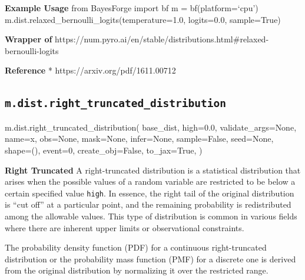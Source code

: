 \documentclass[
  letterpaper,
  DIV=11,
  numbers=noendperiod]{scrartcl}
\newenvironment{Shaded}{\begin{snugshade}}{\end{snugshade}}
\newcommand{\DecValTok}[1]{\textcolor[rgb]{0.68,0.00,0.00}{#1}}
\newcommand{\FloatTok}[1]{\textcolor[rgb]{0.68,0.00,0.00}{#1}}
\newcommand{\NormalTok}[1]{\textcolor[rgb]{0.00,0.23,0.31}{#1}}
\newcommand{\OperatorTok}[1]{\textcolor[rgb]{0.37,0.37,0.37}{#1}}
\newcommand{\StringTok}[1]{\textcolor[rgb]{0.13,0.47,0.30}{#1}}
\newcommand{\VariableTok}[1]{\textcolor[rgb]{0.07,0.07,0.07}{#1}}
\begin{document}
\textbf{Example Usage} from BayesForge import bf m = bf(platform=`cpu')
m.dist.relaxed\_bernoulli\_logits(temperature=1.0, logits=0.0,
sample=True)

\textbf{Wrapper of}
https://num.pyro.ai/en/stable/distributions.html\#relaxed-bernoulli-logits

\textbf{Reference} * https://arxiv.org/pdf/1611.00712

\subsection{\texorpdfstring{\texttt{m.dist.right\_truncated\_distribution}}{m.dist.right\_truncated\_distribution}}\label{right_truncated_distribution}

\begin{Shaded}
\begin{Highlighting}[]
\NormalTok{m.dist.right\_truncated\_distribution(}
\NormalTok{    base\_dist,}
\NormalTok{    high}\OperatorTok{=}\FloatTok{0.0}\NormalTok{,}
\NormalTok{    validate\_args}\OperatorTok{=}\VariableTok{None}\NormalTok{,}
\NormalTok{    name}\OperatorTok{=}\StringTok{\textquotesingle{}x\textquotesingle{}}\NormalTok{,}
\NormalTok{    obs}\OperatorTok{=}\VariableTok{None}\NormalTok{,}
\NormalTok{    mask}\OperatorTok{=}\VariableTok{None}\NormalTok{,}
\NormalTok{    infer}\OperatorTok{=}\VariableTok{None}\NormalTok{,}
\NormalTok{    sample}\OperatorTok{=}\VariableTok{False}\NormalTok{,}
\NormalTok{    seed}\OperatorTok{=}\VariableTok{None}\NormalTok{,}
\NormalTok{    shape}\OperatorTok{=}\NormalTok{(),}
\NormalTok{    event}\OperatorTok{=}\DecValTok{0}\NormalTok{,}
\NormalTok{    create\_obj}\OperatorTok{=}\VariableTok{False}\NormalTok{,}
\NormalTok{    to\_jax}\OperatorTok{=}\VariableTok{True}\NormalTok{,}
\NormalTok{)}
\end{Highlighting}
\end{Shaded}

\textbf{Right Truncated} A right-truncated distribution is a statistical
distribution that arises when the possible values of a random variable
are restricted to be below a certain specified value \texttt{high}. In
essence, the right tail of the original distribution is ``cut off'' at a
particular point, and the remaining probability is redistributed among
the allowable values. This type of distribution is common in various
fields where there are inherent upper limits or observational
constraints.

The probability density function (PDF) for a continuous right-truncated
distribution or the probability mass function (PMF) for a discrete one
is derived from the original distribution by normalizing it over the
restricted range.
\end{document}

